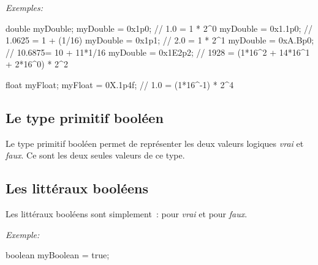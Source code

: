 \textit{Exemples:}
\begin{java}
	double myDouble;
	myDouble = 0x1p0;		// 1.0 = 1 * 2^0
	myDouble = 0x1.1p0;	// 1.0625 = 1 + (1/16)
	myDouble = 0x1p1;		// 2.0 = 1 * 2^1
	myDouble = 0xA.Bp0; // 10.6875= 10 + 11*1/16
	myDouble = 0x1E2p2; // 1928 = (1*16^2 + 14*16^1 + 2*16^0) * 2^2

	float myFloat;
	myFloat = 0X.1p4f;		// 1.0 = (1*16^-1) * 2^4

\end{java}




\subsection{Le type primitif booléen}

Le type primitif booléen permet de représenter les deux valeurs logiques
\textit{vrai} et \textit{faux}. Ce sont les deux seules valeurs de ce type. 


\subsection{Les littéraux booléens}

Les littéraux booléens sont simplement~:  pour \textit{vrai} et
 pour \textit{faux}. 

\pagebreak[2]
\textit{Exemple:}
\nopagebreak
\begin{java}
	boolean myBoolean = true;
\end{java}



